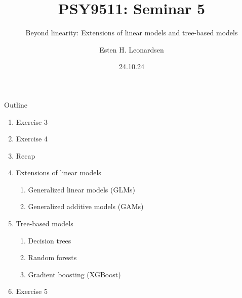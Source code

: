 \documentclass{beamer}
\title{PSY9511: Seminar 5}
\subtitle{Beyond linearity: Extensions of linear models and tree-based models}
\author{Esten H. Leonardsen}
\date{24.10.24}
\begin{document}
	\begin{frame}
	 	\maketitle
	\end{frame}

    \begin{frame}{Outline}
        \begin{enumerate}
            \item Exercise 3
            \item Exercise 4
            \item Recap
            \item Extensions of linear models
            \begin{enumerate}
                \item Generalized linear models (GLMs)
                \item Generalized additive models (GAMs)
            \end{enumerate}
            \item Tree-based models
            \begin{enumerate}
                \item Decision trees
                \item Random forests
                \item Gradient boosting (XGBoost)
            \end{enumerate}
            \item Exercise 5
        \end{enumerate}
    \end{frame}

    
    
    
    
    
    
\end{document}
